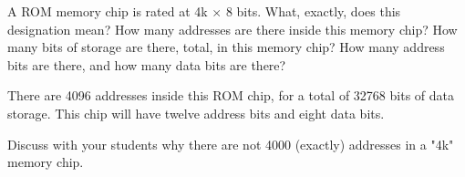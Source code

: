 

A ROM memory chip is rated at 4k $\times$ 8 bits.  What, exactly, does this designation mean?  How many addresses are there inside this memory chip?  How many bits of storage are there, total, in this memory chip?  How many address bits are there, and how many data bits are there?







There are 4096 addresses inside this ROM chip, for a total of 32768 bits of data storage.  This chip will have twelve address bits and eight data bits.







Discuss with your students why there are not 4000 (exactly) addresses in a "4k" memory chip.





